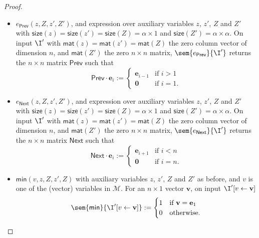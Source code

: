 \begin{proof}
\begin{itemize}
	\item $e_{\mathsf{Prev}}(z,Z,z',Z')$, and expression over auxiliary variables $z$, $z'$, $Z$ and $Z'$ with 
	$\mathsf{size}(z)=\mathsf{size}(z')=\mathsf{size}(Z)=\alpha\times 1$ and 
	$\mathsf{size}(Z')=\alpha\times\alpha$. On input $\I'$ with 
	$\mathsf{mat}(z)=\mathsf{mat}(z')=\mathsf{mat}(Z)$ the zero column vector of dimension $n$, 
	and $\mathsf{mat}(Z')$ the zero $n\times n$ matrix,
	$\sem{e_{\mathsf{Prev}}}{\I'}$ returns the $n\times n$ matrix $\mathsf{Prev}$ such that 
	$$\mathsf{Prev}\cdot \mathbf{e}_i:=\begin{cases} 
	\mathbf{e}_{i-1} & \text{if $i>1$}\\
	\mathbf{0} & \text{if $i=1$}.
	\end{cases}
	$$
	\item $e_{\mathsf{Next}}(z,Z,z',Z')$, and expression over auxiliary variables $z$, $z'$, $Z$ and $Z'$ 
	with $\mathsf{size}(z)=\mathsf{size}(z')=\mathsf{size}(Z)=\alpha\times 1$ and 
	$\mathsf{size}(Z')=\alpha\times\alpha$. On input $\I'$ with 
	$\mathsf{mat}(z)=\mathsf{mat}(z')=\mathsf{mat}(Z)$ the zero column 
	vector of dimension $n$, and $\mathsf{mat}(Z')$ the zero $n\times n$ matrix,
	$\sem{e_{\mathsf{Next}}}{\I'}$ returns the $n\times n$ matrix $\mathsf{Next}$ such that 
	$$\mathsf{Next}\cdot \mathbf{e}_i:=\begin{cases} 
	\mathbf{e}_{i+1} & \text{if $i<n$}\\
	\mathbf{0} & \text{if $i=n$}.
	\end{cases}
	$$
	\item $\textsf{min}(v,z,Z,z',Z)$ with auxiliary variables $z$, $z'$, $Z$ and $Z'$ as before, 
	and $v$ is one of the (vector) variables in $\mathcal{M}$. For an $n\times 1$ vector $\mathbf{v}$, 
	on input $\I'[v\gets \mathbf{v}]$	$$\sem{\mathsf{min}}{\I'[v\gets\mathbf{v}]}:=\begin{cases} 1 & \text{if $\mathbf{v}=\mathbf{e}_1$}\\
		0 & \text{otherwise}.
		\end{cases}$$


\end{itemize}
\end{proof}
